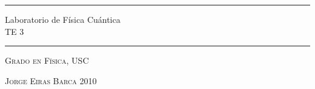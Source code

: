 \documentclass[a4paper,10pt]{article}
\newcommand{\HRule}{\rule{\linewidth}{1mm}}
\begin{document}
  \HRule
  \begin{flushright}
    \Huge Laboratorio de Física Cuántica\\[5mm]
	  TE 3
  \end{flushright}
\HRule
\vspace{1cm}
\begin{center}
\Large\textsc{Grado en Física, USC}
\end{center}
\begin{flushright}
  \Large\textsc{ Jorge Eiras Barca 2010}
\end{flushright}
\end{document}
